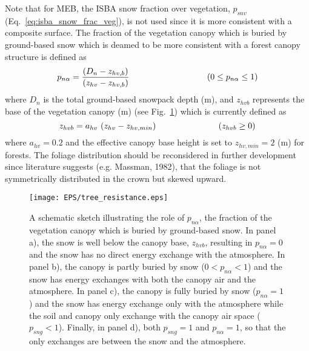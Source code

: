 Note that for MEB, the ISBA snow fraction over vegetation, 
$p_{snv}$ (Eq.~\ref{eq:isba_snow_frac_veg}), 
is not used since it is
more consistent with a composite surface.
The fraction of the vegetation canopy which is buried by ground-based snow
which is deamed to be more consistent with a forest canopy structure
is defined as 
%
\begin{equation}
\label{eq:meb_LAIcansnow}
p_{n\alpha} = 
\frac
{\left(D_n - z_{hv,b}\right)}
{\left(z_{hv} - z_{hv,b}\right)}
\hskip1.25in
\left( 0 \leq  p_{n\alpha} \leq 1\right)
\end{equation}
%
where $D_n$ is the total ground-based snowpack depth (m), 
and $z_{hvb}$
represents the base of the vegetation canopy (m) 
(see Fig.~\ref{fig:forest_snow_MEB}) which is currently defined as
%
\begin{equation}
\label{eq:meb_pn_alphan}
z_{hvb} = a_{hv}\,\left(z_{hv} - z_{hv,min}\right)
\hskip1.in
\left(z_{hvb} \geq 0\right)
%
\end{equation}
%
where $a_{hv}=0.2$ and the effective canopy base height is
set to $z_{hv,min}=2$ (m) for forests. The foliage distribution
should be reconsidered in further development since literature
suggests
(e.g. Massman, 1982)\nocite{Massman1982}, 
that the foliage is not
symmetrically distributed in the crown but skewed upward.



\begin{figure}[!b]
\centerline{ 
\texttt{[image: EPS/tree\_resistance.eps]}}
\caption{
A schematic sketch illustrating the role of $p_{n\alpha}$, the fraction of the vegetation
canopy which is buried by ground-based snow. In panel a), the snow is well
below the canopy base, $z_{hvb}$, 
resulting in $p_{n\alpha}=0$ and the snow has no direct energy exchange with the atmosphere.
In panel b), the canopy is partly buried by snow ($0<p_{n\alpha}<1$) and the snow has energy exchanges
with both the canopy air and the atmosphere.
In panel c), the canopy is fully buried by snow ($p_{n\alpha}=1$) and the snow has energy exchange
only with the atmosphere while the soil and canopy only exchange with
the canopy air space ($p_{sng}<1$). Finally, in panel d), both
$p_{sng}=1$ and $p_{n\alpha}=1$, so
that the only exchanges are between the snow and the atmosphere.
}
\label{fig:forest_snow_MEB}
\end{figure}


